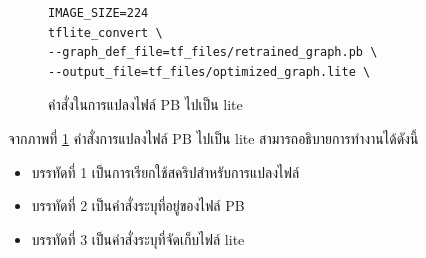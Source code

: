 \begin{figure}[H]
{\begin{lstlisting}
IMAGE_SIZE=224
tflite_convert \
--graph_def_file=tf_files/retrained_graph.pb \
--output_file=tf_files/optimized_graph.lite \
\end{lstlisting}}
\caption{คำสั่งในการแปลงไฟล์ PB ไปเป็น lite }
\label{Fig:convert}
\end{figure}
จากภาพที่ \ref{Fig:convert} คำสั่งการแปลงไฟล์ PB ไปเป็น lite สามารถอธิบายการทำงานได้ดังนี้
\begin{itemize}[label={--}]
\item บรรทัดที่  1	     เป็นการเรียกใช้สคริปสำหรับการแปลงไฟล์
\item บรรทัดที่  2 	     เป็นคำสั่งระบุที่อยู่ของไฟล์ PB 
\item บรรทัดที่  3       เป็นคำสั่งระบุที่จัดเก็บไฟล์ lite  
\end{itemize}



								
			